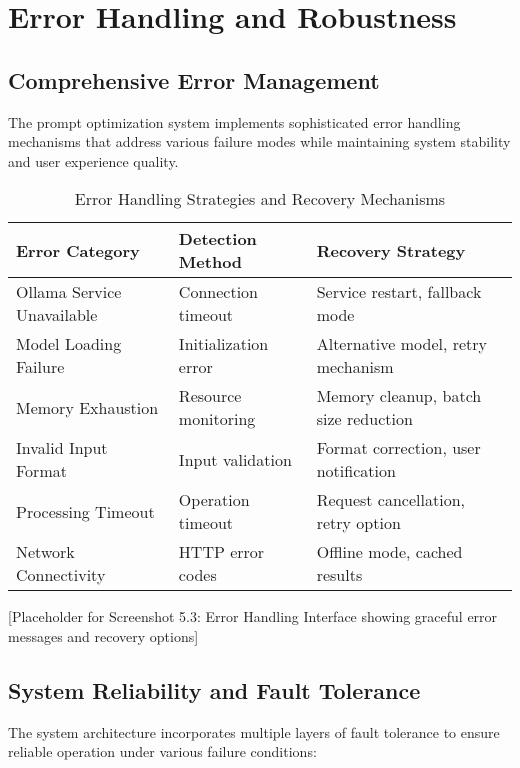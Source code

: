 \section{Error Handling and Robustness}

\subsection{Comprehensive Error Management}

The prompt optimization system implements sophisticated error handling mechanisms that address various failure modes while maintaining system stability and user experience quality.

\begin{table}[H]
\centering
\caption{Error Handling Strategies and Recovery Mechanisms}
\label{tab:error_handling}
{\begin{tabular}{lll}
\toprule
\textbf{Error Category} & \textbf{Detection Method} & \textbf{Recovery Strategy} \\
\midrule
Ollama Service Unavailable & Connection timeout & Service restart, fallback mode \\
Model Loading Failure & Initialization error & Alternative model, retry mechanism \\
Memory Exhaustion & Resource monitoring & Memory cleanup, batch size reduction \\
Invalid Input Format & Input validation & Format correction, user notification \\
Processing Timeout & Operation timeout & Request cancellation, retry option \\
Network Connectivity & HTTP error codes & Offline mode, cached results \\
\bottomrule
\end{tabular}}
\end{table}

[Placeholder for Screenshot 5.3: Error Handling Interface showing graceful error messages and recovery options]

\subsection{System Reliability and Fault Tolerance}

The system architecture incorporates multiple layers of fault tolerance to ensure reliable operation under various failure conditions:

